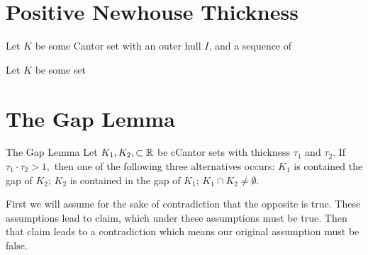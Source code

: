 \section{Positive Newhouse Thickness}
\begin{definition}[Gap]
    Let $K$ be some Cantor set with an outer hull $I$, and a sequence of 
    
\end{definition}

\begin{definition}
    Let $K$ be some set 
    
\end{definition}
\section{The Gap Lemma}
\begin{lemma}{The Gap Lemma}\cite{palis&takens}
    Let $K_1, K_2, \subset \mathbb{R}$ be cCantor sets with thickness $\tau_1$ and  $\tau_2$.  If $\tau_1 \cdot \tau_2 >1,$ then one of the following three alternatives occurs: $K_1$ is contained the gap of $K_2$; $K_2$ is contained in the gap of $K_1$; $K_1 \cap K_2 \neq \emptyset.$
\end{lemma}
First we will assume for the sake of contradiction that the opposite is true.  These assumptions lead to claim, which under these assumptions must be true.  Then that claim leads to a contradiction which means our original assumption must be false.  
